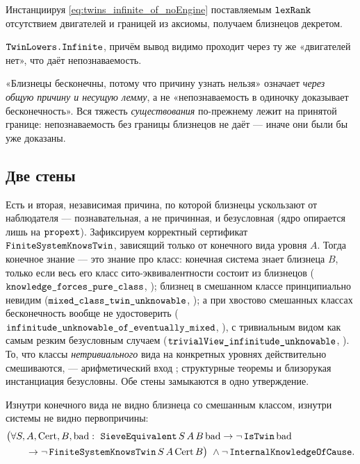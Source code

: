 Инстанциируя \cref{eq:twins_infinite_of_noEngine} поставляемым $\texttt{lexRank}$ отсутствием двигателей
и границей из аксиомы, получаем близнецов декретом.

\begin{theorem}\label{thm:twins_because_unknowable}
\yellow{} $\texttt{TwinLowers.Infinite}$, причём вывод видимо проходит через ту же «двигателей нет»,
что даёт непознаваемость.
\end{theorem}

\begin{remark}
«Близнецы бесконечны, потому что причину узнать нельзя» означает \emph{через общую причину и несущую
лемму}, а не «непознаваемость в одиночку доказывает бесконечность». Вся тяжесть \emph{существования}
по-прежнему лежит на принятой границе: непознаваемость без границы близнецов не даёт --- иначе они были
бы уже доказаны.
\end{remark}

\subsection{Две стены}

Есть и вторая, независимая причина, по которой близнецы ускользают от наблюдателя --- познавательная,
а не причинная, и безусловная (ядро опирается лишь на $\texttt{propext}$). Зафиксируем корректный
сертификат $\texttt{FiniteSystemKnowsTwin}$, зависящий только от конечного вида уровня $A$. Тогда
конечное знание --- это знание про класс: конечная система знает близнеца $B$, только если весь его
класс сито-эквивалентности состоит из близнецов ($\texttt{knowledge\_forces\_pure\_class}$, \green{});
близнец в смешанном классе принципиально невидим ($\texttt{mixed\_class\_twin\_unknowable}$, \green{}); а
при хвостово смешанных классах бесконечность вообще не удостоверить
($\texttt{infinitude\_unknowable\_of\_eventually\_mixed}$, \green{}), с тривиальным видом как самым
резким безусловным случаем ($\texttt{trivialView\_infinitude\_unknowable}$, \green{}). То, что классы
\emph{нетривиального} вида на конкретных уровнях действительно смешиваются, --- арифметический вход
\red{}; структурные теоремы и близорукая инстанциация безусловны. Обе стены замыкаются в одно
утверждение.

\begin{theorem}\label{thm:two_walls_one_nature}
\green{} Изнутри конечного вида не видно близнеца со смешанным классом, изнутри системы не видно
первопричины:
\[
\begin{aligned}
&\bigl(\forall S,A,\mathrm{Cert},B,\mathrm{bad}:\ \code{SieveEquivalent}\,S\,A\,B\,\mathrm{bad} \to \lnot\,\code{IsTwin}\,\mathrm{bad}\\
&\qquad {}\to \lnot\,\code{FiniteSystemKnowsTwin}\,S\,A\,\mathrm{Cert}\,B\bigr)\ \wedge \lnot\,\code{InternalKnowledgeOfCause}.
\end{aligned}
\]
\end{theorem}

